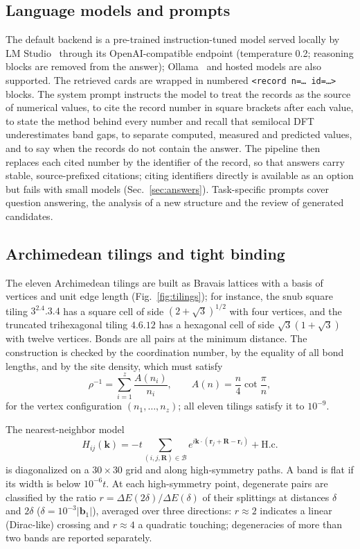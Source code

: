 \documentclass[prmaterials,twocolumn,superscriptaddress,longbibliography,nofootinbib]{revtex4-2}
\newcommand{\code}[1]{\texttt{#1}}
\newcommand{\kvec}{\mathbf{k}}
\newcommand{\Rvec}{\mathbf{R}}
\begin{document}
\subsection{Language models and prompts}

The default backend is a pre-trained instruction-tuned model served locally by
LM Studio~\cite{LMStudio} through its OpenAI-compatible endpoint (temperature 0.2;
reasoning blocks are removed from the answer); Ollama~\cite{Ollama} and hosted models are
also supported. The retrieved cards are wrapped in numbered \code{<record n=\ldots\ id=\ldots>}
blocks. The system prompt instructs the model to treat the records as the source of
numerical values, to cite the record number in square brackets after each value, to state
the method behind every number and recall that semilocal DFT underestimates band gaps, to
separate computed, measured and predicted values, and to say when the records do not contain
the answer. The pipeline then replaces each cited number by the identifier of the record, so
that answers carry stable, source-prefixed citations; citing identifiers directly is
available as an option but fails with small models (Sec.~\ref{sec:answers}). Task-specific
prompts cover question answering, the analysis of a new structure and the review of
generated candidates.

\subsection{Archimedean tilings and tight binding}

The eleven Archimedean tilings are built as Bravais lattices with a basis of vertices and
unit edge length (Fig.~\ref{fig:tilings}); for instance, the snub square tiling
$3^2.4.3.4$ has a square cell of side $(2+\sqrt3)^{1/2}$ with four vertices, and the
truncated trihexagonal tiling $4.6.12$ has a hexagonal cell of side $\sqrt3(1+\sqrt3)$ with
twelve vertices. Bonds are all pairs at the minimum distance. The construction is checked
by the coordination number, by the equality of all bond lengths, and by the site density,
which must satisfy
\begin{equation}
  \rho^{-1} = \sum_{i=1}^{z}\frac{A(n_i)}{n_i}, \qquad A(n)=\frac{n}{4}\cot\frac{\pi}{n},
\end{equation}
for the vertex configuration $(n_1,\ldots,n_z)$; all eleven tilings satisfy it to
$10^{-9}$.

The nearest-neighbor model
\begin{equation}
  H_{ij}(\kvec) = -t\!\!\sum_{(i,j,\Rvec)\in\mathcal B}\!\! e^{i\kvec\cdot
  (\mathbf r_j+\Rvec-\mathbf r_i)} + \text{H.c.}
\end{equation}
is diagonalized on a $30\times30$ grid and along high-symmetry paths. A band is flat if its
width is below $10^{-6}t$. At each high-symmetry point, degenerate pairs are classified by the
ratio $r=\Delta E(2\delta)/\Delta E(\delta)$ of their splittings at distances $\delta$ and
$2\delta$ ($\delta=10^{-3}|\mathbf b_1|$), averaged over three directions: $r\approx2$
indicates a linear (Dirac-like) crossing and $r\approx4$ a quadratic touching; degeneracies
of more than two bands are reported separately.
\end{document}
